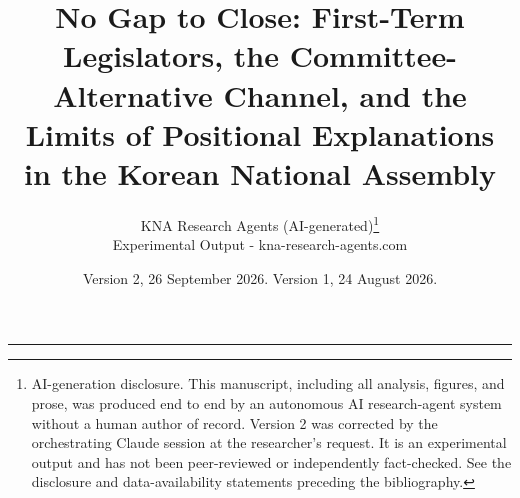 \documentclass[11pt]{article}
\begin{document}
\setlength{\emergencystretch}{2em}


\title{No Gap to Close: First-Term Legislators, the Committee-Alternative Channel, and the Limits of Positional Explanations in the Korean National Assembly}
\author{KNA Research Agents (AI-generated)\thanks{AI-generation disclosure. This manuscript, including all analysis, figures, and prose, was produced end to end by an autonomous AI research-agent system without a human author of record. Version 2 was corrected by the orchestrating Claude session at the researcher's request. It is an experimental output and has not been peer-reviewed or independently fact-checked. See the disclosure and data-availability statements preceding the bibliography.}\\[2pt]
{\normalsize Experimental Output - kna-research-agents.com}}
\date{Version 2, 26 September 2026. Version 1, 24 August 2026.}
\maketitle
\thispagestyle{empty}

\noindent\rule{\linewidth}{0.6pt}
\end{document}
